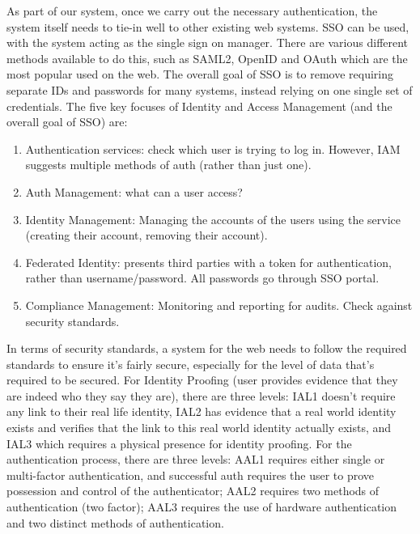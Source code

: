 \documentclass[14pt]{article}
\begin{document}
As part of our system, once we carry out the necessary authentication, the system itself needs to tie-in well to
other existing web systems. SSO can be used, with the system acting as the single sign on manager. There are various
different methods available to do this, such as SAML2, OpenID and OAuth which are the most popular used on the web. 
The overall goal of SSO is to remove requiring separate IDs and passwords for many systems, instead relying on one single
set of credentials. The five key focuses of Identity and Access Management (and the overall goal of SSO) are:

\begin{enumerate}
  \item Authentication services: check which user is trying to log in. However, IAM suggests multiple methods of auth (rather than just one).
  \item Auth Management: what can a user access?
  \item Identity Management: Managing the accounts of the users using the service (creating their account, removing their account).
  \item Federated Identity: presents third parties with a token for authentication, rather than username/password. All passwords go through SSO portal.
  \item Compliance Management: Monitoring and reporting for audits. Check against security standards.
\end{enumerate}
\cite{SSOOverview}

In terms of security standards, a system for the web needs to follow the required standards to ensure it's fairly secure,
especially for the level of data that's required to be secured. For Identity Proofing (user provides evidence that they are indeed who they say they are),
there are three levels: IAL1 doesn't require any link to their real life identity, IAL2 has evidence that a real world identity exists and verifies that the link to this real world identity actually exists,
and IAL3 which requires a physical presence for identity proofing. For the authentication process, there are three levels: AAL1 requires either single or multi-factor authentication, and successful auth requires
the user to prove possession and control of the authenticator; AAL2 requires two methods of authentication (two factor); AAL3 requires the use of hardware authentication and two distinct methods of authentication.
\cite{NISTDigitalIdentityGuidelines}
\end{document}
